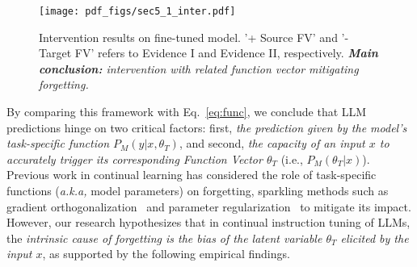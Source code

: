 
\begin{wrapfigure}{hr}{0.50\textwidth}
  \centering
  \vspace{-1.6em}
  \texttt{[image: pdf\_figs/sec5\_1\_inter.pdf]}
  \vspace{-1.5em}
  \caption{Intervention results on fine-tuned model. '+ Source FV' and '- Target FV' refers to Evidence I and Evidence II, respectively. \textit{\textbf{Main conclusion:} intervention with related function vector mitigating forgetting.} }
  \label{fig:sec5:intervention}
  \vspace{-2.0em}
\end{wrapfigure}
By comparing this framework with Eq.~\ref{eq:func}, we conclude that LLM predictions hinge on two critical factors: first, \textit{the prediction given by the model's task-specific function \(P_M(y|x, \theta_T)\)}, and second, \textit{the capacity of an input \(x\) to accurately trigger its corresponding Function Vector \(\theta_T\)} (i.e., $P_M(\theta_T|x)$). Previous work in continual learning has considered the role of task-specific functions (\emph{a.k.a,} model parameters) on forgetting, sparkling methods such as gradient orthogonalization~\citep{lopez2017gradient,chaudhry2018efficient} and parameter regularization~\citep{Kirkpatrick_2017,wu2024meta} to mitigate its impact. However, our research hypothesizes that in continual instruction tuning of LLMs, the \textit{intrinsic cause of forgetting is the bias of the latent variable $\theta_T$ elicited by the input $x$}, as supported by the following empirical findings. %


